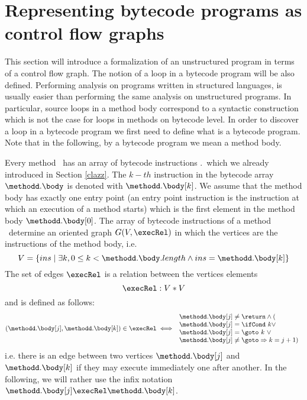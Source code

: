 
\section{Representing bytecode programs as control flow graphs}\label{prelim}

This section will introduce a formalization of an unstructured program in terms of a control flow graph.
The notion of a loop in a bytecode program will be also defined.
Performing analysis on programs written in  structured languages, is usually easier than performing the same analysis 
on unstructured programs. In particular, source loops in a method body correspond to a syntactic construction which is not the 
case for loops in methods on bytecode level. In order to discover a loop in a bytecode program we first need to define 
what is a bytecode program. Note that in the following, by a  bytecode program we mean a method body.

Every method \methodd \ has an array of bytecode instructions \methodd.\body \  which we already introduced in Section \ref{clazz}.
The $k-th$ instruction in the bytecode array $\methodd.\body$ is  denoted with $\methodd.\body[k]$.
 We assume that the method body has exactly one entry point
 (an entry point instruction is the instruction at which an execution of a method starts) which is the first
 element in the method body
$\methodd.\body[0]$.
The array of bytecode instructions of a method \methodd \ determine an oriented graph $G( V , \execRel ) $ in which the vertices are the instructions of the method body,
i.e. $$ V = \{ ins \mid \exists k,  0 \leq k < \methodd.\body.length \wedge ins = \methodd.\body[k] \}$$
The set of edges $\execRel$ is a relation between the vertices elements
$$ \execRel : V * V $$ and is defined  as follows:
$$ (\methodd.\body[j], \methodd.\body[k]) \in \execRel \iff 
   \begin{array}{l} \methodd.\body[j] \neq \return \wedge( \\
                    \methodd.\body[j] = \ifCond \ k \vee \\
		    \methodd.\body[j] = \goto \ k \ \vee \\
		    \methodd.\body[j] \neq \goto \Rightarrow  k = j+1)
   \end{array}$$
 i.e. there is an edge between two vertices $\methodd.\body[j]$ and  $\methodd.\body[k]$ if they may execute immediately one after another.
In the following, we will rather use the infix notation $\methodd.\body[j] \execRel \methodd.\body[k]$.


